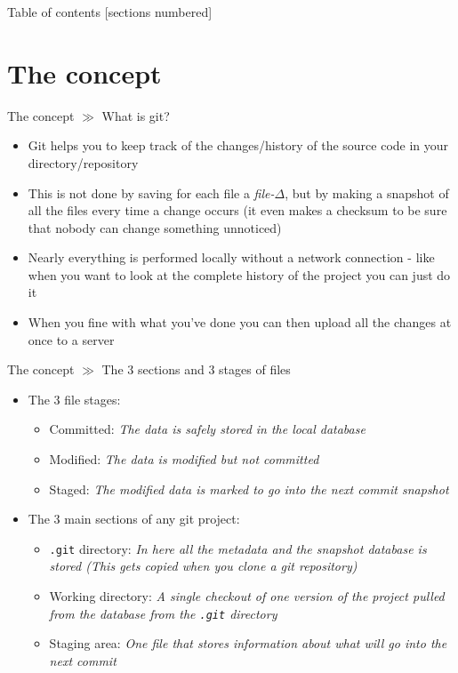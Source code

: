\documentclass[10pt]{beamer}
\title{\mytitleTitle}
\subtitle{\mytitleSubtitle}
\date{\mydate}
\author{\myauthor}
\institute{Universit{\"a}t Stuttgart}
\begin{document}
\maketitle

\begin{frame}{Table of contents}
	[sections numbered]
	\tableofcontents[hideallsubsections]
\end{frame}

\section{The concept}

\begin{frame}{The concept $\gg$ What is git?}
	\begin{itemize}
		\item Git helps you to keep track of the changes/history of the source code in your directory/repository
		\item This is not done by saving for each file a \textit{file-$\Delta$}, but by making a snapshot of all the files every time a change occurs (it even makes a checksum to be sure that nobody can change something unnoticed)
		\item Nearly everything is performed locally without a network connection - like when you want to look at the complete history of the project you can just do it
		\item When you fine with what you've done you can then upload all the changes at once to a server
	\end{itemize}
\end{frame}

\begin{frame}{The concept $\gg$ The 3 sections and 3 stages of files}
	\begin{itemize}
		\item The 3 file stages:
		\begin{itemize}
			\item Committed: \textit{The data is safely stored in the local database}
			\item Modified: \textit{The data is modified but not committed}
			\item Staged: \textit{The modified data is marked to go into the next commit snapshot}
		\end{itemize}
		\item The 3 main sections of any git project:
		\begin{itemize}
			\item \texttt{.git} directory: \textit{In here all the metadata and the snapshot database is stored (This gets copied when you clone a git repository)}
			\item Working directory: \textit{A single checkout of one version of the project pulled from the database from the \texttt{.git} directory}
			\item Staging area: \textit{One file that stores information about what will go into the next commit}
		\end{itemize}
	\end{itemize}
\end{frame}
\end{document}
